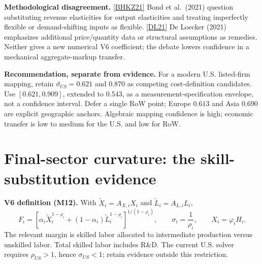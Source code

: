 \documentclass[10pt,a4paper,landscape]{article}
\newcommand{\src}[1]{\hyperlink{ref:#1}{\textsf{[#1]}}}
\begin{document}
\textbf{Methodological disagreement.} \src{BHKZ21} Bond et al.\ (2021) question substituting revenue elasticities for output elasticities and treating imperfectly flexible or demand-shifting inputs as flexible. \src{DL21} De Loecker (2021) emphasizes additional price/quantity data or structural assumptions as remedies. Neither gives a new numerical V6 coefficient; the debate lowers confidence in a mechanical aggregate-markup transfer.

\textbf{Recommendation, separate from evidence.} For a modern U.S. listed-firm mapping, retain $\vartheta_{US}=0.621$ and $0.870$ as competing cost-definition candidates. Use $[0.621,0.909]$, extended to $0.543$, as a measurement-specification envelope, not a confidence interval. Defer a single RoW point; Europe $0.613$ and Asia $0.690$ are explicit geographic anchors. Algebraic mapping confidence is high; economic transfer is low to medium for the U.S. and low for RoW.

\clearpage
\section[Final-sector curvature: the skill-substitution evidence]{Final-sector curvature: the skill-substitution evidence}
\textbf{V6 definition (M12).} With $\widetilde X_i=A_{X,i}X_i$ and $\widetilde L_i=A_{L,i}L_i$,
\[
F_i=\left[\alpha_i\widetilde X_i^{1-\rho_i}+(1-\alpha_i)\widetilde L_i^{1-\rho_i}\right]^{1/(1-\rho_i)},
\qquad \sigma_i=\frac1{\rho_i},\qquad X_i=\varphi_i H_i.
\]
The relevant margin is skilled labor allocated to intermediate production versus unskilled labor. Total skilled labor includes R\&D. The current U.S. solver requires $\rho_{US}>1$, hence $\sigma_{US}<1$; retain evidence outside this restriction.
\end{document}
